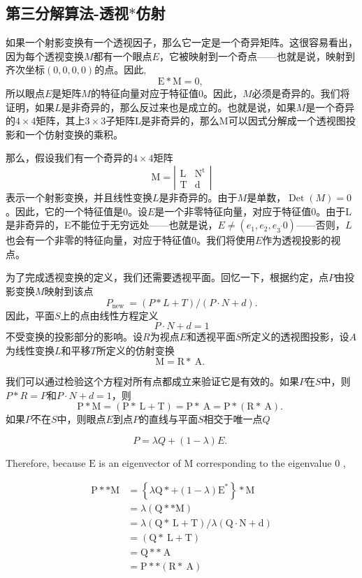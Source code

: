 \subsection*{第三分解算法-透视$*$仿射}
如果一个射影变换有一个透视因子，那么它一定是一个奇异矩阵。这很容易看出，因为每个透视变换$M$都有一个眼点$E$，它被映射到一个奇点——也就是说，映射到齐次坐标$(0,0,0,0)$的点。因此,
$$
\mathrm{E} * \mathrm{M}=0 \text {, }
$$
所以眼点$E$是矩阵$M$的特征向量对应于特征值0。因此，$M$必须是奇异的。我们将证明，如果$L$是非奇异的，那么反过来也是成立的。也就是说，如果$M$是一个奇异的$4 \times 4$矩阵，其上$3 \times3$子矩阵L是非奇异的，那么M可以因式分解成一个透视图投影和一个仿射变换的乘积。

那么，假设我们有一个奇异的$4 \times 4$矩阵
$$
\mathrm{M}=\left|\begin{array}{cc}
\mathrm{L} & \mathrm{N}^{\mathrm{t}} \\
\mathrm{T} & \mathrm{d}
\end{array}\right|
$$
表示一个射影变换，并且线性变换$L$是非奇异的。由于$M$是单数，$\operatorname{Det}(M)=0$。因此，它的一个特征值是0。设$E$是一个非零特征向量，对应于特征值0。由于L是非奇异的，E不能位于无穷远处——也就是说，$E \neq\left(e_{1}, e_{2}, e_{3^{\prime}} 0\right)$——否则，$L$也会有一个非零的特征向量，对应于特征值0。我们将使用$E$作为透视投影的视点。

为了完成透视变换的定义，我们还需要透视平面。回忆一下，根据约定，点$P$由投影变换$M$映射到该点
$$
P_{\text {new }}=(P * L+T) /(P \cdot N+d) .
$$
因此，平面$S$上的点由线性方程定义
$$
P \cdot N+d=1
$$
不受变换的投影部分的影响。设$R$为视点$E$和透视平面$S$所定义的透视图投影，设$A$为线性变换$L$和平移$T$所定义的仿射变换
$$
\mathrm{M}=\mathrm{R} * \mathrm{~A} \text {. }
$$

我们可以通过检验这个方程对所有点都成立来验证它是有效的。如果$P$在$S$中，则$P * R=P$和$P \cdot N+d=1$，则
$$
\mathrm{P} * \mathrm{M}=(\mathrm{P} * \mathrm{~L}+\mathrm{T})=\mathrm{P} * \mathrm{~A}=\mathrm{P} *(\mathrm{R} * \mathrm{~A}) \text {. }
$$
如果$P$不在$S$中，则眼点$E$到点$P$的直线与平面$S$相交于唯一点$Q$

$$
P=\lambda Q+(1-\lambda) E \text {. }
$$

Therefore, because $\mathrm{E}$ is an eigenvector of $\mathrm{M}$ corresponding to the eigenvalue 0 ,

$$
\begin{aligned}
\mathrm{P} * * \mathrm{M} &=\left\{\lambda \mathrm{Q} *+(1-\lambda) \mathrm{E}^{*}\right\} * \mathrm{M} \\
&=\lambda(\mathrm{Q} * * \mathrm{M}) \\
&=\lambda(\mathrm{Q} * \mathrm{~L}+\mathrm{T}) / \lambda(\mathrm{Q} \cdot \mathrm{N}+\mathrm{d}) \\
&=(\mathrm{Q} * \mathrm{~L}+\mathrm{T}) \\
&=\mathrm{Q} * * \mathrm{~A} \\
&=\mathrm{P} * *(\mathrm{R} * \mathrm{~A})
\end{aligned}
$$

